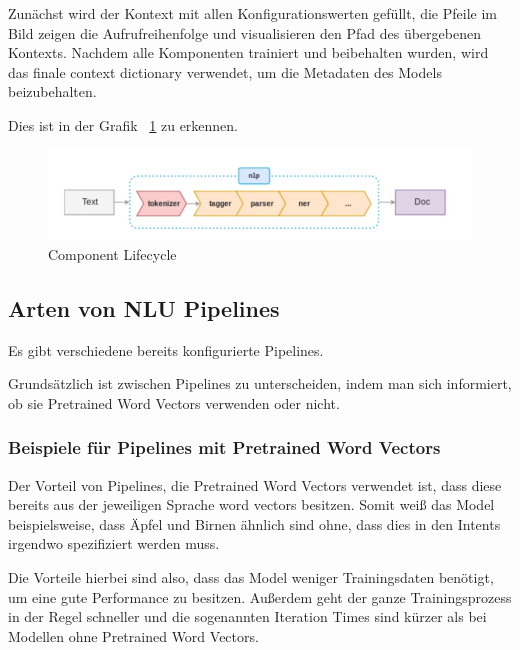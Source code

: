 Zunächst wird der Kontext mit allen Konfigurationswerten gefüllt, die Pfeile im Bild zeigen die Aufrufreihenfolge und visualisieren den Pfad des übergebenen Kontexts.
Nachdem alle Komponenten trainiert und beibehalten wurden, wird das finale context dictionary verwendet, um die Metadaten des Models beizubehalten.\cite{componentLifecycle, componentLifecycleDoc}

Dies ist in der Grafik ~\ref{fig:pipeline_image} zu erkennen.

\begin{figure}[hbt!]
    \centering
    \includegraphics[scale=0.5]{pics/pipeline}
    \caption{Component Lifecycle~\cite{pipelineImage}}
    \label{fig:pipeline_image}
\end{figure}

\subsection{Arten von NLU Pipelines}

Es gibt verschiedene bereits konfigurierte Pipelines.\cite{howToChooseAPipeline}

Grundsätzlich ist zwischen Pipelines zu unterscheiden, indem man sich informiert, ob sie Pretrained Word Vectors verwenden oder nicht.

\subsubsection{Beispiele für Pipelines mit Pretrained Word Vectors}

Der Vorteil von Pipelines, die Pretrained Word Vectors verwendet ist, dass diese bereits aus der jeweiligen Sprache word vectors besitzen.
Somit weiß das Model beispielsweise, dass Äpfel und Birnen ähnlich sind ohne, dass dies in den Intents irgendwo spezifiziert werden muss.\cite{differenceStackOverflow, rasaMasterclassPreConfiguredPipelines}

Die Vorteile hierbei sind also, dass das Model weniger Trainingsdaten benötigt, um eine gute Performance zu besitzen.
Außerdem geht der ganze Trainingsprozess in der Regel schneller und die sogenannten Iteration Times sind kürzer als bei Modellen ohne Pretrained Word Vectors.\cite{differenceStackOverflow, pretrainedVsSupervised, rasaMasterclassPreConfiguredPipelines}

